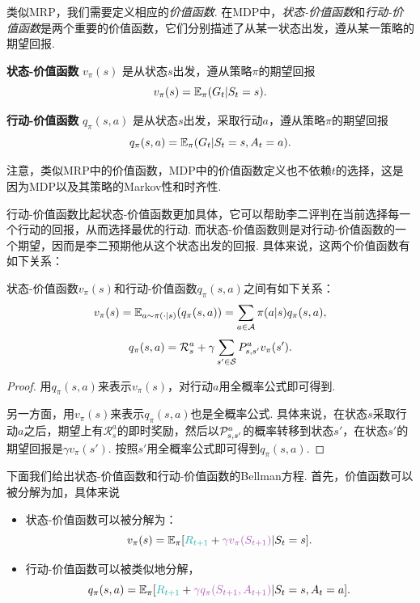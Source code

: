 类似MRP，我们需要定义相应的\textit{价值函数}. 在MDP中，\textit{状态-价值函数}和\textit{行动-价值函数}是两个重要的价值函数，它们分别描述了从某一状态出发，遵从某一策略的期望回报. 

\begin{definition}[价值函数]
\textbf{状态-价值函数} $v_\pi(s)$ 是从状态$s$出发，遵从策略$\pi$的期望回报
    \[v_\pi(s) = \mathbb{E}_\pi(G_t|S_t=s).\]

\textbf{行动-价值函数} $q_\pi(s,a)$ 是从状态$s$出发，采取行动$a$，遵从策略$\pi$的期望回报
    \[q_\pi(s,a) = \mathbb{E}_\pi(G_t|S_t=s,A_t=a).\]
\end{definition}
注意，类似MRP中的价值函数，MDP中的价值函数定义也不依赖$t$的选择，这是因为MDP以及其策略的Markov性和时齐性. 

行动-价值函数比起状态-价值函数更加具体，它可以帮助李二评判在当前选择每一个行动的回报，从而选择最优的行动. 而状态-价值函数则是对行动-价值函数的一个期望，因而是李二预期他从这个状态出发的回报. 具体来说，这两个价值函数有如下关系：

\begin{proposition}\label{prop:state-action-value}
状态-价值函数$v_\pi(s)$和行动-价值函数$q_\pi(s,a)$之间有如下关系：
    \[v_\pi(s) = \mathbb{E}_{a\sim\pi(\cdot|s)}(q_\pi(s,a))=\sum_{a\in\mathcal A}\pi(a|s)q_\pi(s,a),\]
    \[q_\pi(s,a) =\mathcal R_s^a + \gamma \sum_{s'\in \mathcal S}P_{s,s'}^a v_\pi(s').\]
\end{proposition}
\begin{proof}
    用$q_\pi(s,a)$来表示$v_\pi(s)$，对行动$a$用全概率公式即可得到. 

    另一方面，用$v_\pi(s)$来表示$q_\pi(s,a)$也是全概率公式. 具体来说，在状态$s$采取行动$a$之后，期望上有$\mathcal R_s^a$的即时奖励，然后以$\mathcal P_{s,s'}^a$的概率转移到状态$s'$，在状态$s'$的期望回报是$\gamma v_\pi(s')$. 按照$s'$用全概率公式即可得到$q_\pi(s,a)$.
\end{proof}

下面我们给出状态-价值函数和行动-价值函数的Bellman方程. 首先，价值函数可以被分解为加，具体来说
\begin{itemize}
    \item 状态-价值函数可以被分解为：
    \[v_\pi(s) = \E_\pi[\contrastlight{R_{t+1}} + \light{\gamma v_\pi(S_{t+1})}|S_t=s].\]
    \item 行动-价值函数可以被类似地分解，
\[q_\pi(s,a) = \E_\pi[\contrastlight{R_{t+1}} + \light{\gamma q_\pi(S_{t+1},A_{t+1})}|S_t=s,A_t=a].\]
\end{itemize}

